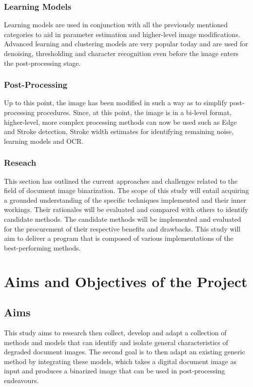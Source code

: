 \documentclass[a4paper, 12pt]{report}
\begin{document}
\subsubsection{Learning Models}
Learning models are used in conjunction with all the previously mentioned
categories to aid in parameter estimation and higher-level image modifications.
Advanced learning and clustering models are very popular today and are used for
denoising, thresholding and character recognition even before the image enters
the post-processing stage.

\subsubsection{Post-Processing}
Up to this point, the image has been modified in such a way as to simplify
post-processing procedures. Since, at this point, the image is in a bi-level
format, higher-level, more complex processing methods can now be used such as
Edge and Stroke detection, Stroke width estimates for identifying remaining
noise, learning models and OCR.

\subsubsection{Reseach}
This section has outlined the current approaches and challenges related to the
field of document image binarization. The scope of this study will entail
acquiring a grounded understanding of the specific techniques implemented and
their inner workings. Their rationales will be evaluated and compared with
others to identify candidate methods. The candidate methods will be implemented
and evaluated for the procurement of their respective benefits and drawbacks.
This study will aim to deliver a program that is composed of various
implementations of the best-performing methods. \newpage

\section{Aims and Objectives of the Project}
\subsection{Aims}
This study aims to research then collect, develop and adapt a collection of
methods and models that can identify and isolate general characteristics of
degraded document images. The second goal is to then adapt an existing generic
method by integrating these models, which takes a digital document image as
input and produces a binarized image that can be used in post-processing
endeavours.
\end{document}
